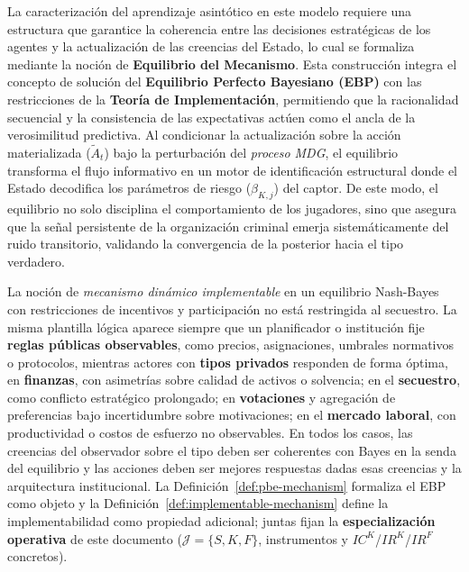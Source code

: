 \documentclass[12pt]{article}
\theoremstyle{definition}
\theoremstyle{remark}
\newcommand{\1}{\mathbf{1}}
\begin{document}
\noindent La caracterización del aprendizaje asintótico en este modelo requiere una estructura que garantice la coherencia entre las decisiones estratégicas de los agentes y la actualización de las creencias del Estado, lo cual se formaliza mediante la noción de \textbf{Equilibrio del Mecanismo}. Esta construcción integra el concepto de solución del \textbf{Equilibrio Perfecto Bayesiano (EBP)} con las restricciones de la \textbf{Teoría de Implementación}, permitiendo que la racionalidad secuencial y la consistencia de las expectativas actúen como el ancla de la verosimilitud predictiva. Al condicionar la actualización sobre la acción materializada ($\tilde{A}_t$) bajo la perturbación del \textit{proceso MDG}, el equilibrio transforma el flujo informativo en un motor de identificación estructural donde el Estado decodifica los parámetros de riesgo ($\beta_{K,j}$) del captor. De este modo, el equilibrio no solo disciplina el comportamiento de los jugadores, sino que asegura que la señal persistente de la organización criminal emerja sistemáticamente del ruido transitorio, validando la convergencia de la posterior hacia el tipo verdadero.





\noindent La noción de \emph{mecanismo dinámico implementable} en un equilibrio Nash-Bayes con restricciones de incentivos y participación no está restringida al secuestro. La misma plantilla lógica aparece siempre que un planificador o institución fije \textbf{reglas públicas observables}, como precios, asignaciones, umbrales normativos o protocolos, mientras actores con \textbf{tipos privados} responden de forma óptima, en \textbf{finanzas}, con asimetrías sobre calidad de activos o solvencia; en el \textbf{secuestro}, como conflicto estratégico prolongado; en \textbf{votaciones} y agregación de preferencias bajo incertidumbre sobre motivaciones; en el \textbf{mercado laboral}, con productividad o costos de esfuerzo no observables. En todos los casos, las creencias del observador sobre el tipo deben ser coherentes con Bayes en la senda del equilibrio y las acciones deben ser mejores respuestas dadas esas creencias y la arquitectura institucional. La Definición~\ref{def:pbe-mechanism} formaliza el EBP como objeto y la Definición~\ref{def:implementable-mechanism} define la implementabilidad como propiedad adicional; juntas fijan la \textbf{especialización operativa} de este documento \textup{(}$\mathcal{J}=\{S,K,F\}$, instrumentos y $IC^K$/$IR^K$/$IR^F$ concretos\textup{)}.
\end{document}
